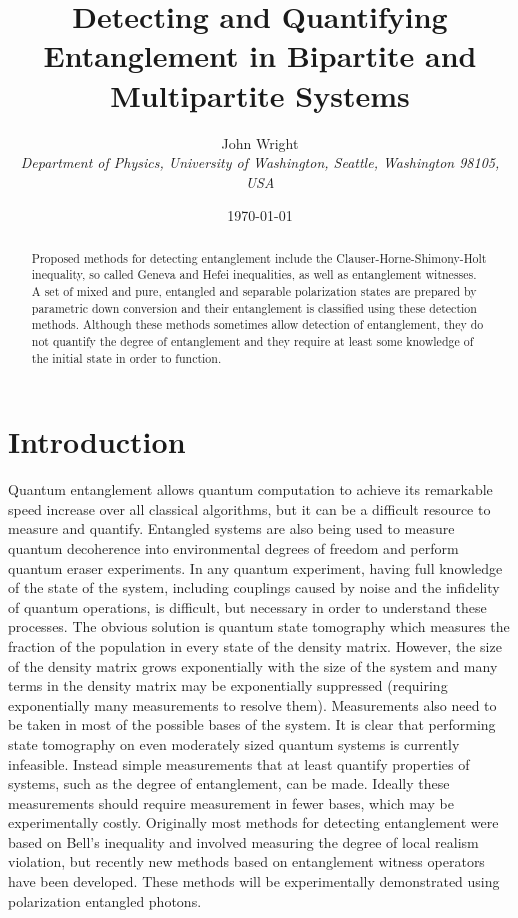 \documentclass[11pt]{article}
\begin{document}
         
\title{Detecting and Quantifying Entanglement in Bipartite and Multipartite Systems}
\author{John Wright \\ \emph{Department of Physics, University of Washington, Seattle, Washington 98105, USA}}
\date{\today}
\maketitle

\begin{abstract}
Proposed methods for detecting entanglement include the Clauser-Horne-Shimony-Holt inequality, so called
Geneva and Hefei inequalities, as well as entanglement witnesses.  A set of mixed and pure, entangled and 
separable polarization states are prepared by parametric down conversion and their entanglement is 
classified using these detection methods.  Although these methods sometimes allow detection of entanglement, they 
do not quantify the degree of entanglement and they require at least some knowledge of the initial state 
in order to function.
\end{abstract}

\section{Introduction}
Quantum entanglement allows quantum computation to achieve its remarkable speed increase over all classical
algorithms, but it can be a difficult resource to measure and quantify.  Entangled systems are also being
used to measure quantum decoherence into environmental degrees of freedom and perform quantum eraser
experiments.  In any quantum experiment, having full knowledge of the state of the system, including
couplings caused by noise and the infidelity of quantum operations, is difficult, but necessary in order
to understand these processes.  The obvious solution is quantum state tomography which measures the 
fraction of the population in every state of the density matrix.  However, the size of the density matrix 
grows exponentially with the size of the system and many terms in the density matrix may be exponentially 
suppressed (requiring exponentially many measurements to resolve them).  Measurements also need to be taken
in most of the possible bases of the system.  It is clear that performing state tomography on even
moderately sized quantum systems is currently infeasible.  Instead simple measurements that at least
quantify properties of systems, such as the degree of entanglement, can be made.  Ideally these measurements
should require measurement in fewer bases, which may be experimentally costly.  Originally most
methods for detecting entanglement were based on Bell's inequality and involved measuring the degree of local 
realism violation, but recently new methods based on entanglement witness operators have been developed.
These methods will be experimentally demonstrated using polarization entangled photons.
\end{document}
